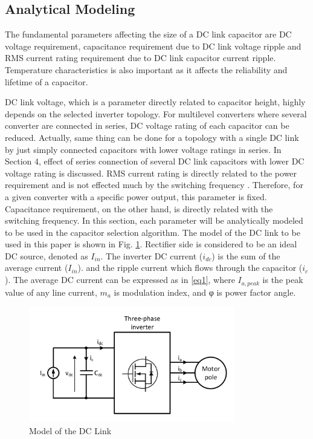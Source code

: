 \documentclass[conference,a4paper,twocolumn]{IEEEtran}
\begin{document}
\subsection{Analytical Modeling}


The fundamental parameters affecting the size of a DC link capacitor are DC voltage requirement, capacitance requirement due to DC link voltage ripple and RMS current rating requirement due to DC link capacitor current ripple. Temperature characteristics is also important as it affects the reliability and lifetime of a capacitor. 

DC link voltage, which is a parameter directly related to capacitor height, highly depends on the selected inverter topology. For multilevel converters where several converter are connected in series, DC voltage rating of each capacitor can be reduced. Actually, same thing can be done for a topology with a single DC link by just simply connected capacitors with lower voltage ratings in series. In Section 4, effect of series connection of several DC link capacitors with lower DC voltage rating is discussed. RMS current rating is directly related to the power requirement and is not effected much by the switching frequency \cite{Wang2013,Wang2015,Su2010}. Therefore, for a given converter with a specific power output, this parameter is fixed. Capacitance requirement, on the other hand, is directly related with the switching frequency. In this section, each parameter will be analytically modeled to be used in the capacitor selection algorithm. The model of the DC link to be used in this paper is shown in Fig. \ref{fig3}.
Rectifier side is considered to be an ideal DC source, denoted as $I_{in}$. The inverter DC current ($i_{dc}$) is the sum of the average current ($I_{in}$). and the ripple current which flows through the capacitor ($i_c$). The average DC current can be expressed as in \ref{eq1}, where $I_{a,peak}$ is the peak value of any line current, $m_a$ is modulation index, and φ is power factor angle.

\begin{figure}[h]
  \centering
  \includegraphics[width=9cm]{fig3}
  \caption{Model of the DC Link}
  \label{fig3}
\end{figure}
\end{document}
